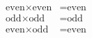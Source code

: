 \documentclass[preview]{standalone}
\begin{document}
\begin{align*}
\begin{aligned}\text{even} \times \text{even} &= \text{even} \\\text{odd} \times \text{odd} &= \text{odd} \\\text{even} \times \text{odd} &= \text{even}\end{aligned}
\end{align*}
\end{document}
